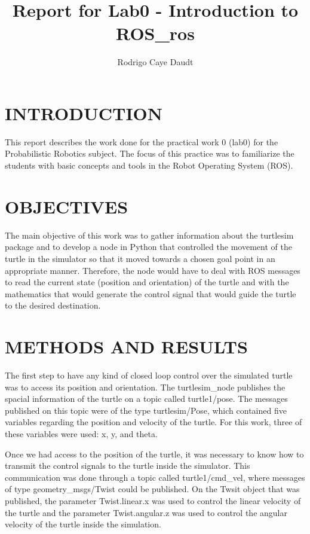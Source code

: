 \documentclass[a4paper, 10pt, conference]{ieeeconf}
\title{\LARGE \bf
Report for Lab0 - Introduction to ROS\_ros
}
\author{Rodrigo Caye Daudt}
\begin{document}
\maketitle
\thispagestyle{empty}
\pagestyle{empty}


\section{INTRODUCTION}

This report describes the work done for the practical work 0 (lab0) for the Probabilistic Robotics subject. The focus of this practice was to familiarize the students with basic concepts and tools in the Robot Operating System (ROS).


\section{OBJECTIVES}

The main objective of this work was to gather information about the turtlesim package and to develop a node in Python that controlled the movement of the turtle in the simulator so that it moved towards a chosen goal point in an appropriate manner. Therefore, the node would have to deal with ROS messages to read the current state (position and orientation) of the turtle and with the mathematics that would generate the control signal that would guide the turtle to the desired destination.


\section{METHODS AND RESULTS}

The first step to have any kind of closed loop control over the simulated turtle was to access its position and orientation. The turtlesim\_node publishes the spacial information of the turtle on a topic called turtle1/pose. The messages published on this topic were of the type turtlesim/Pose, which contained five variables regarding the position and velocity of the turtle. For this work, three of these variables were used: x, y, and theta.

Once we had access to the position of the turtle, it was necessary to know how to transmit the control signals to the turtle inside the simulator. This communication was done through a topic called turtle1/cmd\_vel, where messages of type geometry\_msgs/Twist could be published. On the Twsit object that was published, the parameter Twist.linear.x was used to control the linear velocity of the turtle and the parameter Twist.angular.z was used to control the angular velocity of the turtle inside the simulation.
\end{document}
